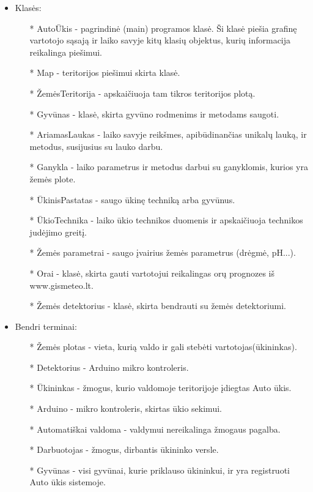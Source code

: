 \documentclass[oneside]{VUMIFPSkursinis}
\begin{document}
\begin{itemize}
	\item Klasės:
		\begin{itemize}
			\item[*] AutoŪkis - pagrindinė (main) programos klasė. Ši klasė piešia grafinę vartotojo sąsają ir laiko savyje kitų klasių objektus, kurių informacija reikalinga piešimui.
			\item[*] Map - teritorijos piešimui skirta klasė.
			\item[*] ŽemėsTeritorija - apskaičiuoja tam tikros teritorijos plotą.
 			\item[*] Gyvūnas - klasė, skirta gyvūno rodmenims ir metodams saugoti.
			\item[*] AriamasLaukas - laiko savyje reikšmes, apibūdinančias unikalų lauką, ir metodus, susijusius su lauko darbu.
			\item[*] Ganykla - laiko parametrus ir metodus darbui su ganyklomis, kurios yra žemės plote.
			\item[*] ŪkinisPastatas - saugo ūkinę techniką arba gyvūnus.
			\item[*] ŪkioTechnika - laiko ūkio technikos duomenis ir apskaičiuoja technikos judėjimo greitį.
			\item[*] Žemės parametrai - saugo įvairius žemės parametrus (drėgmė, pH...).
			\item[*] Orai - klasė, skirta gauti vartotojui reikalingas orų prognozes iš www.gismeteo.lt.
			\item[*] Žemės detektorius - klasė, skirta bendrauti su žemės detektoriumi.

		\end{itemize}
	\item Bendri terminai:
		\begin{itemize}
			\item[*] Žemės plotas - vieta, kurią valdo ir gali stebėti vartotojas(ūkininkas). 
			\item[*] Detektorius - Arduino mikro kontroleris.
			\item[*] Ūkininkas - žmogus, kurio valdomoje teritorijoje įdiegtas Auto ūkis.
			\item[*] Arduino - mikro kontroleris, skirtas ūkio sekimui.
			\item[*] Automatiškai valdoma - valdymui nereikalinga žmogaus pagalba.
			\item[*] Darbuotojas - žmogus, dirbantis ūkininko versle.
			\item[*] Gyvūnas - visi gyvūnai, kurie priklauso ūkininkui, ir yra registruoti Auto ūkis sistemoje.
		\end{itemize}
\end{itemize}
\end{document}
